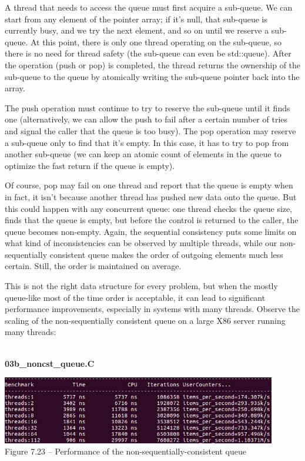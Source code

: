 A thread that needs to access the queue must first acquire a sub-queue. We can start from any element of the pointer array; if it's null, that sub-queue is currently busy, and we try the next element, and so on until we reserve a sub-queue. At this point, there is only one thread operating on the sub-queue, so there is no need for thread safety (the sub-queue can even be std::queue). After the operation (push or pop) is completed, the thread returns the ownership of the sub-queue to the queue by atomically writing the sub-queue pointer back into the array.

The push operation must continue to try to reserve the sub-queue until it finds one (alternatively, we can allow the push to fail after a certain number of tries and signal the caller that the queue is too busy). The pop operation may reserve a sub-queue only to find that it's empty. In this case, it has to try to pop from another sub-queue (we can keep an atomic count of elements in the queue to optimize the fast return if the queue is empty).

Of course, pop may fail on one thread and report that the queue is empty when in fact, it isn't because another thread has pushed new data onto the queue. But this could happen with any concurrent queue: one thread checks the queue size, finds that the queue is empty, but before the control is returned to the caller, the queue becomes non-empty. Again, the sequential consistency puts some limits on what kind of inconsistencies can be observed by multiple threads, while our non-sequentially consistent queue makes the order of outgoing elements much less certain. Still, the order is maintained on average. 

This is not the right data structure for every problem, but when the mostly queue-like most of the time order is acceptable, it can lead to significant performance improvements, especially in systems with many threads. Observe the scaling of the non-sequentially consistent queue on a large X86 server running many threads:

\hspace*{\fill} \\ %
\noindent
\textbf{03b\_noncst\_queue.C}
\begin{center}
\includegraphics[width=0.9\textwidth]{content/2/chapter7/images/23.jpg}\\
Figure 7.23 – Performance of the non-sequentially-consistent queue
\end{center}

